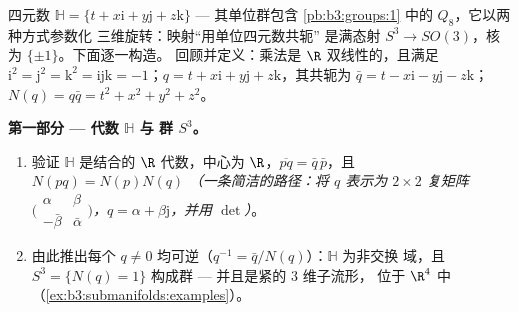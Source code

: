 \begin{problem}\label{pb:b3:submanifolds:1}
四元数 $\mathbb H = \{t + x\mathrm i + y\mathrm j +
z\mathrm k\}$ --- 其单位群包含 \cref{pb:b3:groups:1} 中的
$Q_8$，它以两种方式参数化
三维旋转：映射“用单位四元数共轭”
是满态射 $S^3 \to
SO(3)$，核为 $\{\pm1\}$。下面逐一构造。
回顾并定义：乘法是 $\R$ 双线性的，且满足
$\mathrm i^2 = \mathrm j^2 = \mathrm k^2 =
\mathrm{ijk} = -1$；$q = t + x\mathrm i +
y\mathrm j + z\mathrm k$，其共轭为 $\bar q = t - x\mathrm i -
y\mathrm j - z\mathrm k$；$N(q) = q\bar q = t^2 + x^2 + y^2
+ z^2$。

\medskip
\noindent\textbf{第一部分 --- 代数 $\mathbb H$ 与
群 $S^3$。}
\begin{enumerate}
  \item 验证 $\mathbb H$ 是结合的
        $\R$ 代数，中心为 $\R$，$\overline{pq} =
        \bar q\,\bar p$，且 $N(pq) = N(p)N(q)$
        \emph{（一条简洁的路径：将 $q$ 表示为
        $2\times2$ 复矩阵
        $\bigl(\begin{smallmatrix}\alpha & \beta\\
        -\bar\beta & \bar\alpha\end{smallmatrix}\bigr)$，$q =
        \alpha + \beta\mathrm j$，并用 $\det$）}。
  \item 由此推出每个 $q \neq 0$ 均可逆（$q^{-1} =
        \bar q/N(q)$）：$\mathbb H$ 为非交换
        域，且 $S^3 = \{N(q) = 1\}$ 构成群 ---
        并且是紧的 $3$ 维子流形，
        位于 $\R^4$ 中（\cref{ex:b3:submanifolds:examples}）。
\end{enumerate}


\end{problem}
